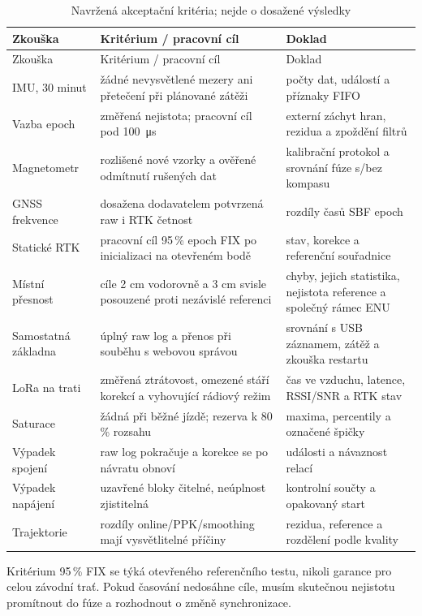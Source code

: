 \small
\begin{longtable}{@{}L{0.23\textwidth}L{0.38\textwidth}L{0.31\textwidth}@{}}
  \caption{Navržená akceptační kritéria; nejde o dosažené výsledky}\label{tab:acceptance}\\
  \toprule
  Zkouška & Kritérium / pracovní cíl & Doklad \\
  \midrule
  \endfirsthead
  \toprule
  Zkouška & Kritérium / pracovní cíl & Doklad \\
  \midrule
  \endhead
  IMU, 30 minut & žádné nevysvětlené mezery ani přetečení při plánované zátěži & počty dat, událostí a příznaky FIFO \\
  Vazba epoch & změřená nejistota; pracovní cíl pod \SI{100}{\micro\second} & externí záchyt hran, rezidua a zpoždění filtrů \\
  Magnetometr & rozlišené nové vzorky a ověřené odmítnutí rušených dat & kalibrační protokol a srovnání fúze s/bez kompasu \\
  GNSS frekvence & dosažena dodavatelem potvrzená raw i RTK četnost & rozdíly časů SBF epoch \\
  Statické RTK & pracovní cíl 95\,\% epoch FIX po inicializaci na otevřeném bodě & stav, korekce a referenční souřadnice \\
  Místní přesnost & cíle 2 cm vodorovně a 3 cm svisle posouzené proti nezávislé referenci & chyby, jejich statistika, nejistota reference a společný rámec ENU \\
  Samostatná základna & úplný raw log a přenos při souběhu s webovou správou & srovnání s USB záznamem, zátěž a zkouška restartu \\
  LoRa na trati & změřená ztrátovost, omezené stáří korekcí a vyhovující rádiový režim & čas ve vzduchu, latence, RSSI/SNR a RTK stav \\
  Saturace & žádná při běžné jízdě; rezerva k 80\,\% rozsahu & maxima, percentily a označené špičky \\
  Výpadek spojení & raw log pokračuje a korekce se po návratu obnoví & události a návaznost relací \\
  Výpadek napájení & uzavřené bloky čitelné, neúplnost zjistitelná & kontrolní součty a opakovaný start \\
  Trajektorie & rozdíly online/PPK/smoothing mají vysvětlitelné příčiny & rezidua, reference a rozdělení podle kvality \\
  \bottomrule
\end{longtable}
\normalsize

Kritérium 95\,\% FIX se týká otevřeného referenčního testu, nikoli garance
pro celou závodní trať. Pokud časování nedosáhne cíle, musím skutečnou
nejistotu promítnout do fúze a rozhodnout o změně synchronizace.

